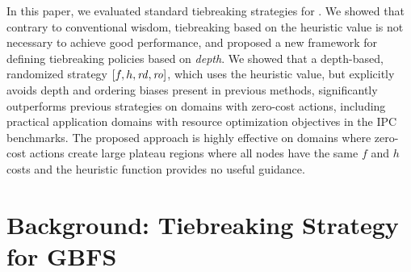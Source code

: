 In this paper, we evaluated standard tiebreaking
strategies for \astar.
We showed that contrary to conventional wisdom, tiebreaking based on the heuristic value is not necessary to achieve good performance, and proposed
a new framework for defining tiebreaking policies based on \emph{depth}.
We showed that a depth-based, randomized strategy $[f,h,{\mbox{\textit{rd}}},{\mbox{\textit{ro}}}]$, which uses the heuristic value, but explicitly avoids depth and ordering biases present in previous methods,
significantly outperforms previous strategies on domains with zero-cost actions, 
including practical application domains with resource optimization objectives in the IPC benchmarks.
The proposed approach is highly effective on domains where zero-cost actions create large plateau regions where all nodes have the same $f$ and $h$ costs
and the heuristic function provides no useful guidance.




\section{Background: Tiebreaking Strategy for GBFS}

